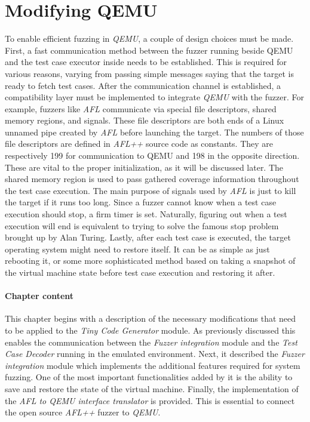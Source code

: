 \cleardoublepage
\section{Modifying QEMU} \label{chap:qemu}

To enable efficient fuzzing in \textit{QEMU}, a couple of design choices must be made. First, a fast communication method between the fuzzer running beside QEMU and the test case executor inside needs to be established. This is required for various reasons, varying from passing simple messages saying that the target is ready to fetch test cases. After the communication channel is established, a compatibility layer must be implemented to integrate \textit{QEMU} with the fuzzer. For example, fuzzers like \textit{AFL} communicate via special file descriptors, shared memory regions, and signals. These file descriptors are both ends of a Linux unnamed pipe created by \textit{AFL} before launching the target. The numbers of those file descriptors are defined in \textit{AFL++} source code as constants. They are respectively 199 for communication to QEMU and 198 in the opposite direction. These are vital to the proper initialization, as it will be discussed later. The shared memory region is used to pass gathered coverage information throughout the test case execution. The main purpose of signals used by \textit{AFL} is just to kill the target if it runs too long. Since a fuzzer cannot know when a test case execution should stop, a firm timer is set. Naturally, figuring out when a test execution will end is equivalent to trying to solve the famous stop problem brought up by Alan Turing. Lastly, after each test case is executed, the target operating system might need to restore itself. It can be as simple as just rebooting it, or some more sophisticated method based on taking a snapshot of the virtual machine state before test case execution and restoring it after.

\paragraph{Chapter content}
This chapter begins with a description of the necessary modifications that need to be applied to the \textit{Tiny Code Generator} module. As previously discussed this enables the communication between the \textit{Fuzzer integration} module and the \textit{Test Case Decoder} running in the emulated environment. Next, it described the \textit{Fuzzer integration} module which implements the additional features required for system fuzzing. One of the most important functionalities added by it is the ability to save and restore the state of the virtual machine. Finally, the implementation of the \textit{AFL to QEMU interface translator} is provided. This is essential to connect the open source \textit{AFL++} fuzzer to \textit{QEMU}.


